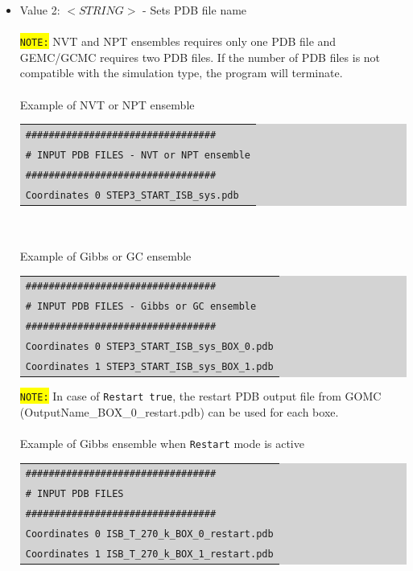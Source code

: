 \begin{description}
\begin{itemize}
	\item Value 2: $<STRING>$ - Sets PDB file name\\\\
	\colorbox{yellow}{\texttt{NOTE:}} NVT and NPT ensembles requires only one PDB file and GEMC/GCMC requires two PDB files. If the number of PDB files is not compatible with the simulation type, the program will terminate. \\\\
	Example of NVT or NPT ensemble\\
	\colorbox{lightgray}{
	\begin{tabular}{l}
	\texttt{\#\#\#\#\#\#\#\#\#\#\#\#\#\#\#\#\#\#\#\#\#\#\#\#\#\#\#\#\#\#\#\#\#}\\
	\texttt{\# INPUT PDB FILES - NVT or NPT ensemble}\\
	\texttt{\#\#\#\#\#\#\#\#\#\#\#\#\#\#\#\#\#\#\#\#\#\#\#\#\#\#\#\#\#\#\#\#\#}\\
	\texttt{Coordinates 0 STEP3\_START\_ISB\_sys.pdb}\\
	\end{tabular}}\\\\
	Example of Gibbs or GC ensemble\\
	\colorbox{lightgray}{
	\begin{tabular}{l}
	\texttt{\#\#\#\#\#\#\#\#\#\#\#\#\#\#\#\#\#\#\#\#\#\#\#\#\#\#\#\#\#\#\#\#\#}\\
	\texttt{\# INPUT PDB FILES - Gibbs or GC ensemble}\\
	\texttt{\#\#\#\#\#\#\#\#\#\#\#\#\#\#\#\#\#\#\#\#\#\#\#\#\#\#\#\#\#\#\#\#\#}\\
	\texttt{Coordinates 0 STEP3\_START\_ISB\_sys\_BOX\_0.pdb}\\
	\texttt{Coordinates 1 STEP3\_START\_ISB\_sys\_BOX\_1.pdb}\\
	\end{tabular}}
	
	\colorbox{yellow}{\texttt{NOTE:}} In case of \texttt{Restart   true}, the restart PDB output file from GOMC (OutputName\_BOX\_0\_restart.pdb) can be used for each boxe. \\\\
	Example of Gibbs ensemble when \texttt{Restart} mode is active\\
	\colorbox{lightgray}{
	\begin{tabular}{l}
	\texttt{\#\#\#\#\#\#\#\#\#\#\#\#\#\#\#\#\#\#\#\#\#\#\#\#\#\#\#\#\#\#\#\#\#}\\
	\texttt{\# INPUT PDB FILES}\\
	\texttt{\#\#\#\#\#\#\#\#\#\#\#\#\#\#\#\#\#\#\#\#\#\#\#\#\#\#\#\#\#\#\#\#\#}\\
	\texttt{Coordinates 0 ISB\_T\_270\_k\_BOX\_0\_restart.pdb}\\
	\texttt{Coordinates 1 ISB\_T\_270\_k\_BOX\_1\_restart.pdb}\\
	\end{tabular}}
	\end{itemize}
	

\end{description}
